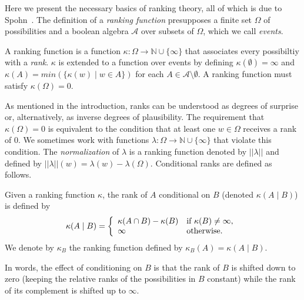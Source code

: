 \documentclass{llncs}
\begin{document}
Here we present the necessary basics of ranking theory, all of which is due to Spohn~\cite{DBLP:books/daglib/0035277}.
The definition of a \emph{ranking function} presupposes a finite set $\Omega$ of possibilities
	and a boolean algebra $\mathcal{A}$ over subsets of $\Omega$, which we call \emph{events}.

\begin{definition}
A ranking function is a function $\kappa: \Omega \rightarrow \mathbb{N} \cup \{\infty\}$ that associates every possibiltiy with a \emph{rank}.
$\kappa$ is extended to a function over events by defining $\kappa(\emptyset) = \infty$ and $\kappa(A) = min( \{ \kappa(w) \mid w \in A \} )$ for each $A \in \mathcal{A} \setminus \emptyset$.
A ranking function must satisfy $\kappa(\Omega) = 0$.
\end{definition}

As mentioned in the introduction, ranks can be understood as degrees of surprise or, alternatively, as inverse degrees of plausibility.
The requirement that $\kappa(\Omega) = 0$ is equivalent to the condition that at least one $w \in \Omega$ receives a rank of 0.
We sometimes work with functions $\lambda: \Omega \rightarrow \mathbb{N} \cup \{\infty\}$ that violate this condition.
The \emph{normalization} of $\lambda$ is a ranking function denoted by $|| \lambda ||$ and defined by $|| \lambda ||(w) = \lambda(w) - \lambda(\Omega)$.
Conditional ranks are defined as follows.

\begin{definition}\label{def:conditional}
Given a ranking function $\kappa$, the rank of $A$ conditional on $B$ (denoted $\kappa(A \mid B)$) is defined by
\[
                \kappa(A \mid B) = \left\{ \begin{array}{ll}
                 \kappa(A \cap B) - \kappa(B)& \mbox{if $\kappa(B) \not = \infty$,} \\
                 \infty & \mbox{otherwise.} \\
                   \end{array}
                  \right. \\
\] 
We denote by $\kappa_{B}$ the ranking function defined by $\kappa_{B}(A) = \kappa(A \mid B)$.
\end{definition}

In words, the effect of conditioning on $B$ is that the rank of $B$ is shifted down to zero (keeping the relative ranks of the possibilities in $B$ constant) 
	while the rank of its complement is shifted up to $\infty$.
\end{document}
